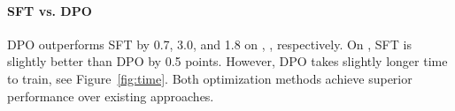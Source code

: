 

\paragraph{SFT vs. DPO}
DPO outperforms SFT by 0.7, 3.0, and 1.8 on \ttest, \tr, \tf respectively. On \tg, SFT is slightly better than DPO by 0.5 points. However, DPO takes slightly longer time to train, see Figure~\ref{fig:time}. Both optimization methods achieve superior performance over existing approaches. 





